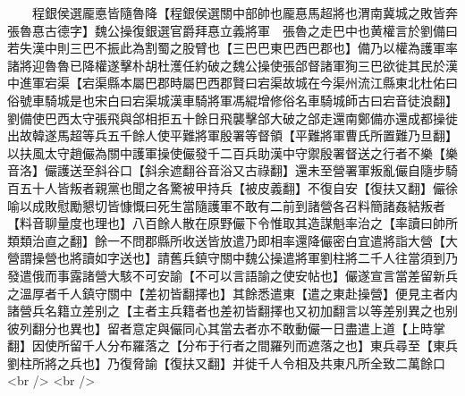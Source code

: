 　　程銀侯選龎悳皆隨魯降【程銀侯選關中部帥也龎惪馬超將也渭南冀城之敗皆奔張魯惪古德字】魏公操復銀選官爵拜惪立義將軍　張魯之走巴中也黄權言於劉備曰若失漢中則三巴不振此為割蜀之股臂也【三巴巴東巴西巴郡也】備乃以權為護軍率諸將迎魯魯已降權遂擊朴胡杜濩任約破之魏公操使張郃督諸軍狥三巴欲徙其民於漢中進軍宕渠【宕渠縣本屬巴郡時屬巴西郡賢曰宕渠故城在今渠州流江縣東北杜佑曰俗號車騎城是也宋白曰宕渠城漢車騎將軍馮緄增修俗名車騎城師古曰宕音徒浪翻】劉備使巴西太守張飛與郃相拒五十餘日飛襲擊郃大破之郃走還南鄭備亦還成都操徙出故韓遂馬超等兵五千餘人使平難將軍殷署等督領【平難將軍曹氏所置難乃旦翻】以扶風太守趙儼為關中護軍操使儼發千二百兵助漢中守禦殷署督送之行者不樂【樂音洛】儼護送至斜谷口【斜余遮翻谷音浴又古祿翻】還未至營署軍叛亂儼自隨步騎百五十人皆叛者親黨也聞之各驚被甲持兵【被皮義翻】不復自安【復扶又翻】儼徐喻以成敗慰勵懇切皆慷慨曰死生當隨護軍不敢有二前到諸營各召料簡諸姦結叛者【料音聊量度也理也】八百餘人散在原野儼下令惟取其造謀魁率治之【率讀曰帥所類類治直之翻】餘一不問郡縣所收送皆放遣乃即相率還降儼密白宜遣將詣大營【大營謂操營也將讀如字送也】請舊兵鎮守關中魏公操遣將軍劉柱將二千人往當須到乃發遣俄而事露諸營大駭不可安諭【不可以言語諭之使安帖也】儼遂宣言當差留新兵之溫厚者千人鎮守關中【差初皆翻擇也】其餘悉遣東【遣之東赴操營】便見主者内諸營兵名籍立差别之【主者主兵籍者也差初皆翻擇也又初加翻言以等差别異之也别彼列翻分也異也】留者意定與儼同心其當去者亦不敢動儼一日盡遣上道【上時掌翻】因使所留千人分布羅落之【分布于行者之間羅列而遮落之也】東兵尋至【東兵劉柱所將之兵也】乃復脅諭【復扶又翻】并徙千人令相及共東凡所全致二萬餘口<br />
<br />
